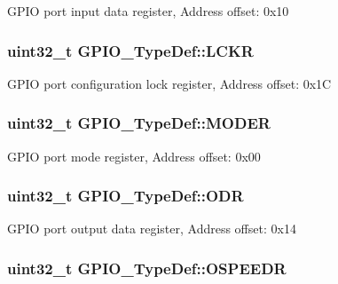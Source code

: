 G\-P\-I\-O port input data register, Address offset\-: 0x10 \hypertarget{struct_g_p_i_o___type_def_a95a59d4b1d52be521f3246028be32f3e}{
\subsubsection[{L\-C\-K\-R}]{ uint32\-\_\-t G\-P\-I\-O\-\_\-\-Type\-Def\-::\-L\-C\-K\-R}}\label{struct_g_p_i_o___type_def_a95a59d4b1d52be521f3246028be32f3e}
G\-P\-I\-O port configuration lock register, Address offset\-: 0x1\-C \hypertarget{struct_g_p_i_o___type_def_ac2505d096b6b650f1647b8e0ff8b196b}{
\subsubsection[{M\-O\-D\-E\-R}]{ uint32\-\_\-t G\-P\-I\-O\-\_\-\-Type\-Def\-::\-M\-O\-D\-E\-R}}\label{struct_g_p_i_o___type_def_ac2505d096b6b650f1647b8e0ff8b196b}
G\-P\-I\-O port mode register, Address offset\-: 0x00 \hypertarget{struct_g_p_i_o___type_def_a6fb78f4a978a36032cdeac93ac3c9c8b}{
\subsubsection[{O\-D\-R}]{ uint32\-\_\-t G\-P\-I\-O\-\_\-\-Type\-Def\-::\-O\-D\-R}}\label{struct_g_p_i_o___type_def_a6fb78f4a978a36032cdeac93ac3c9c8b}
G\-P\-I\-O port output data register, Address offset\-: 0x14 \hypertarget{struct_g_p_i_o___type_def_a0d233d720f18ae2050f9131fa6faf7c6}{
\subsubsection[{O\-S\-P\-E\-E\-D\-R}]{ uint32\-\_\-t G\-P\-I\-O\-\_\-\-Type\-Def\-::\-O\-S\-P\-E\-E\-D\-R}}\label{struct_g_p_i_o___type_def_a0d233d720f18ae2050f9131fa6faf7c6}
